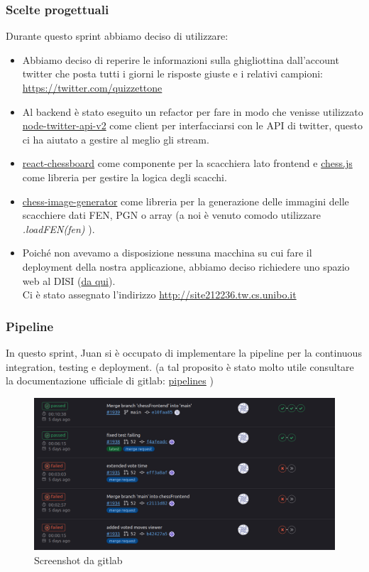 \documentclass{article}
\begin{document}
\subsubsection{Scelte progettuali}
Durante questo sprint abbiamo deciso di utilizzare:
\begin{itemize}
    \item Abbiamo deciso di reperire le informazioni sulla ghigliottina dall'account twitter che posta tutti i giorni le risposte giuste e i relativi campioni: \href{https://twitter.com/quizzettone}{https://twitter.com/quizzettone}
    \item Al backend \`e stato eseguito un refactor per fare in modo che venisse utilizzato \href{https://github.com/PLhery/node-twitter-api-v2}{node-twitter-api-v2} come client per interfacciarsi con le API di twitter, questo ci ha aiutato a gestire al meglio gli stream.
    \item \href{https://github.com/Clariity/react-chessboard}{react-chessboard} come componente per la scacchiera lato frontend e \href{https://github.com/jhlywa/chess.js}{chess.js} come libreria per gestire la logica degli scacchi.
    \item \href{https://www.npmjs.com/package/chess-image-generator}{chess-image-generator} come libreria per la generazione delle immagini delle scacchiere dati FEN, PGN o array (a noi \`e venuto comodo utilizzare \textit{.loadFEN(fen)} ).
    \item Poich\'e non avevamo a disposizione nessuna macchina su cui fare il deployment della nostra applicazione, abbiamo deciso richiedere uno spazio web al DISI (\href{https://disi.unibo.it/it/dipartimento/servizi-tecnici-e-amministrativi/servizi-informatici/gruppi-spazi-web-e-database}{da qui}). \\
    Ci \`e stato assegnato l'indirizzo \href{http://site212236.tw.cs.unibo.it}{http://site212236.tw.cs.unibo.it}
\end{itemize}
\subsubsection{Pipeline}
In questo sprint, Juan si \`e occupato di implementare la pipeline per la continuous integration, testing e deployment. (a tal proposito \`e stato molto utile consultare la documentazione ufficiale di gitlab: \href{https://docs.gitlab.com/ee/ci/pipelines/}{pipelines} )
\begin{figure}[H]
    \centering
    \includegraphics[scale=0.25]{misc/example_pipeline.png}
    \caption{Screenshot da gitlab}
    \label{fig:pipeline}
\end{figure}
\end{document}

